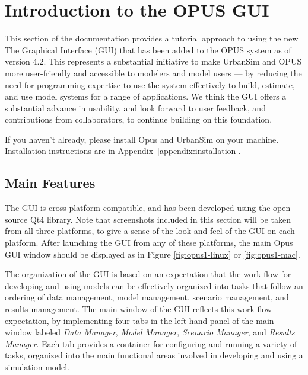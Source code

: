\chapter{Introduction to the OPUS GUI}

This section of the documentation provides a tutorial approach to using the
new The Graphical Interface (GUI) that has been added to the OPUS system as
of version 4.2.  This represents a substantial initiative to make UrbanSim
and OPUS more user-friendly and accessible to modelers and model users ---
by reducing the need for programming expertise to use the system
effectively to build, estimate, and use model systems for a range of
applications.  We think the GUI offers a substantial advance in usability,
and look forward to user feedback, and contributions from collaborators, to
continue building on this foundation.

If you haven't already, please install Opus and UrbanSim on your machine.
Installation instructions are in Appendix~\ref{appendix:installation}.

\section{Main Features}

The GUI is cross-platform compatible, and has been developed using the open
source Qt4 library.  Note that screenshots included in this section will be
taken from all three platforms, to give a sense of the look and feel of the
GUI on each platform.  After launching the GUI from any of these platforms,
the main Opus GUI window should be displayed as in Figure
\ref{fig:opus1-linux} or \ref{fig:opus1-mac}.

The organization of the GUI is based on an expectation that the work flow
for developing and using models can be effectively organized into tasks
that follow an ordering of data management, model management, scenario
management, and results management.  The main window of the GUI reflects
this work flow expectation, by implementing four tabs in the left-hand
panel of the main window labeled \emph{Data Manager}, \emph{Model Manager},
\emph{Scenario Manager}, and \emph{Results Manager}.  Each tab provides a
container for configuring and running a variety of tasks, organized into
the main functional areas involved in developing and using a simulation
model.

